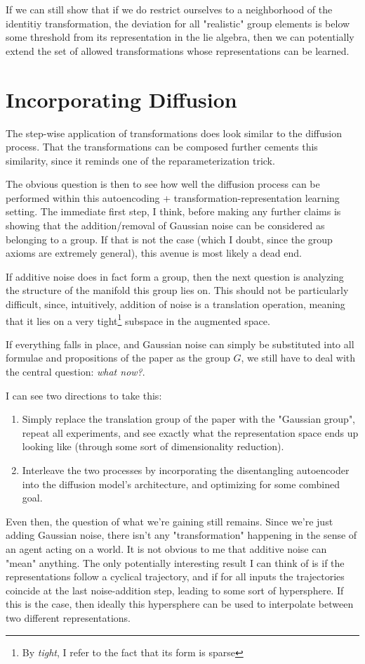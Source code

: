 \documentclass{article}
\begin{document}
If we can still show that if we do restrict ourselves to a neighborhood of the identitiy transformation, the deviation for all "realistic" group elements is below some threshold from its representation in the lie algebra, then we can potentially extend the set of allowed transformations whose representations can be learned.
\section{Incorporating Diffusion}

The step-wise application of transformations does look similar to the diffusion process. That the transformations can be composed further cements this similarity, since it reminds one of the reparameterization trick. 

The obvious question is then to see how well the diffusion process can be performed within this autoencoding + transformation-representation learning setting. The immediate first step, I think, before making any further claims is showing that the addition/removal of Gaussian noise can be considered as belonging to a group. If that is not the case (which I doubt, since the group axioms are extremely general), this avenue is most likely a dead end.

If additive noise does in fact form a group, then the next question is analyzing the structure of the manifold this group lies on. This should not be particularly difficult, since, intuitively, addition of noise is a translation operation, meaning that it lies on a very tight\footnote{By \textit{tight}, I refer to the fact that its form is sparse} subspace in the augmented space.

If everything falls in place, and Gaussian noise can simply be substituted into all formulae and propositions of the paper as the group $G$, we still have to deal with the central question: \textit{what now?}.

I can see two directions to take this:
\begin{enumerate}
\item Simply replace the translation group of the paper with the "Gaussian group", repeat all experiments, and see exactly what the representation space ends up looking like (through some sort of dimensionality reduction).
\item Interleave the two processes by incorporating the disentangling autoencoder into the diffusion model's architecture, and optimizing for some combined goal.
\end{enumerate}
Even then, the question of what we're gaining still remains. Since we're just adding Gaussian noise, there isn't any "transformation" happening in the sense of an agent acting on a world. It is not obvious to me that additive noise can "mean" anything. The only potentially interesting result I can think of is if the representations follow a cyclical trajectory, and if for all inputs the trajectories coincide at the last noise-addition step, leading to some sort of hypersphere. If this is the case, then ideally this hypersphere can be used to interpolate between two different representations.
\end{document}
